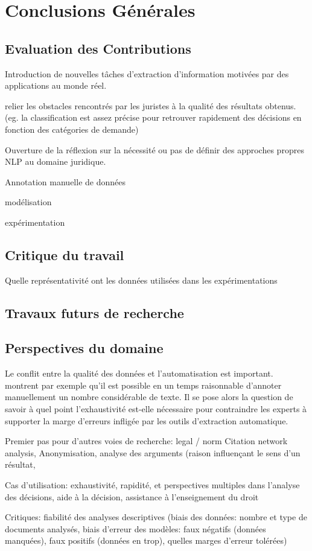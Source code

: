 \chapter*{Conclusions Générales}
\label{chap:conclusion}

\section{Evaluation des Contributions}
\label{sec:conclusion:contributions}
Introduction de nouvelles tâches d'extraction d'information motivées par des applications au monde réel.

relier les obstacles rencontrés par les juristes à la qualité des résultats obtenus. (eg. la classification est assez précise pour retrouver rapidement des décisions en fonction des catégories de demande)

Ouverture de la réflexion sur la nécessité ou pas de définir des approches propres NLP au domaine juridique.

Annotation manuelle de données

modélisation

expérimentation


\section{Critique du travail}
\label{sec:conclusion:critique}
Quelle représentativité ont les données utilisées dans les expérimentations

\section{Travaux futurs de recherche}
\label{sec:conclusion:extensions}

\section{Perspectives du domaine}
\label{sec:conclusion:perspectives}

Le conflit entre la qualité des données et l'automatisation est important. \cite{Galgani2015lexa} montrent par exemple qu'il est possible en un temps raisonnable d'annoter manuellement un nombre considérable de texte. Il se pose alors la question de savoir à quel point l'exhaustivité est-elle nécessaire pour contraindre les experts à supporter la marge d'erreurs infligée par les outils d'extraction automatique.

Premier pas pour d'autres voies de recherche: legal / norm Citation network analysis, Anonymisation, analyse des arguments (raison influençant le sens d'un résultat, 

Cas d'utilisation: exhaustivité, rapidité, et perspectives multiples dans l'analyse des décisions, aide à la décision, assistance à l'enseignement du droit

Critiques: fiabilité des analyses descriptives (biais des données: nombre et type de documents analysés, biais d'erreur des modèles: faux négatifs (données manquées), faux positifs (données en trop), quelles marges d'erreur tolérées)
